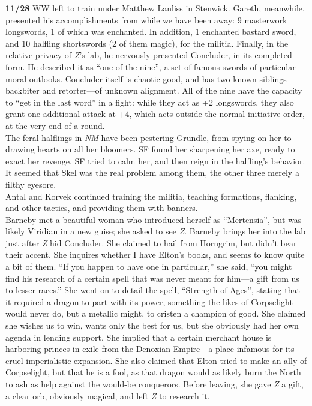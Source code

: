 \documentclass[letterpaper]{article}
\begin{document}
\noindent\textbf{11/28} WW left to train under Matthew Lanliss in Stenwick.   Gareth, meanwhile, presented his accomplishments from while we have been away: 9 masterwork longswords, 1 of which was enchanted. In addition, 1 enchanted bastard sword, and 10 halfling shortswords (2 of them magic), for the militia. Finally, in the relative privacy of \emph{Z}'s lab, he nervously presented Concluder, in its completed form.  He described it as ``one of the nine'', a set of famous swords of particular moral outlooks.  Concluder itself is chaotic good, and has two known siblings---backbiter and retorter---of unknown alignment.  All of the nine have the capacity to ``get in the last word'' in a fight: while they act as +2 longswords, they also grant one additional attack at +4, which acts outside the normal initiative order, at the very end of a round.\\

\noindent The feral halflings in \emph{NM} have been pestering Grundle, from spying on her to drawing hearts on all her bloomers. SF found her sharpening her axe, ready to exact her revenge.  SF tried to calm her, and then reign in the halfling's behavior.  It seemed that Skel was the real problem among them, the other three merely a filthy eyesore.  \\

\noindent Antal and Korvek continued training the militia, teaching formations, flanking, and other tactics, and providing them with banners.\\

\noindent Barneby met a beautiful woman who introduced herself as ``Mertensia'', but was likely Viridian in a new guise; she asked to see \emph{Z}. Barneby brings her into the lab just after \emph{Z} hid Concluder.  She claimed to hail from Horngrim, but didn't bear their accent.  She inquires whether I have Elton's books, and seems to know quite a bit of them.  ``If you happen to have one in particular,'' she said, ``you might find his research of a certain spell that was never meant for him---a gift from us to lesser races.'' She went on to detail the spell, ``Strength of Ages'', stating that it required a dragon to part with its power, something the likes of Corpselight would never do, but a metallic might, to cristen a champion of good.  She claimed she wishes us to win, wants only the best for us, but she obviously had her own agenda in lending support.  She implied that a certain merchant house is harboring princes in exile from the Denoxian Empire---a place infamous for its cruel imperialistic expansion.  She also claimed that Elton tried to make an ally of Corpselight, but that he is a fool, as that dragon would as likely burn the North to ash as help against the would-be conquerors. Before leaving, she gave \emph{Z} a gift, a clear orb, obviously magical, and left \emph{Z} to research it.\\
\end{document}
